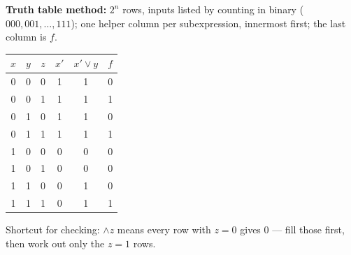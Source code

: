 \documentclass{fkt-notes}
\theoremstyle{definition}
\begin{document}
\textbf{Truth table method:} $2^n$ rows, inputs listed by counting in
binary ($000, 001, \ldots, 111$); one helper column per subexpression,
innermost first; the last column is $f$.

\begin{example}[Truth table of $p(x, y, z) = (x' \vee y) \wedge z$]
  \begin{center}
    \begin{tabular}{ccc|cc|c}
      $x$ & $y$ & $z$ & $x'$ & $x' \vee y$ & $f$ \\ \hline
      0   & 0   & 0   & 1    & 1           & 0   \\
      0   & 0   & 1   & 1    & 1           & 1   \\
      0   & 1   & 0   & 1    & 1           & 0   \\
      0   & 1   & 1   & 1    & 1           & 1   \\
      1   & 0   & 0   & 0    & 0           & 0   \\
      1   & 0   & 1   & 0    & 0           & 0   \\
      1   & 1   & 0   & 0    & 1           & 0   \\
      1   & 1   & 1   & 0    & 1           & 1
    \end{tabular}
  \end{center}
  Shortcut for checking: $\wedge z$ means every row with $z = 0$ gives
  $0$ --- fill those first, then work out only the $z = 1$ rows.
\end{example}
\end{document}
